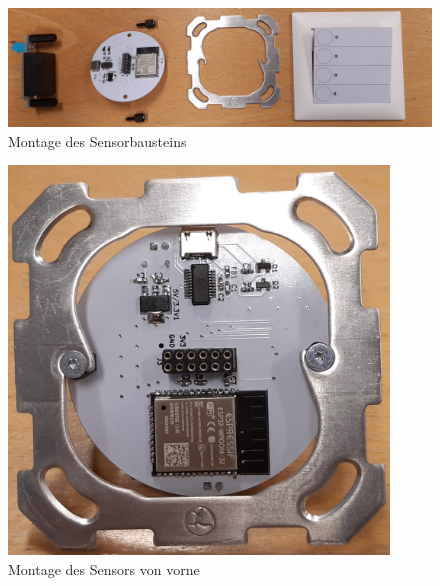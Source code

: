 \begin{figure}[h!]
	\centering
	\includegraphics[width=1\textwidth]{graphics/Sensorbaustein_aufbau.jpg}
	\caption{Montage des Sensorbausteins}
	\label{pic: sensor_montage}
\end{figure}

\begin{figure}[htb]
	\centering
	\begin{minipage}[t]{0.45\linewidth}
		\centering
		\includegraphics[width=0.9\textwidth]{graphics/Sensorbaustein_Einbau_vorne.jpg}
		\caption{Montage des Sensors von vorne}
		\label{pic: sensor_montage_vorne}
	\end{minipage}%
	\hfill
	\begin{minipage}[t]{0.45\linewidth}
		\centering

\end{minipage}
\end{figure}
